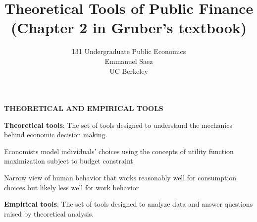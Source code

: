 \documentclass[landscape]{slides}
\author{131 Undergraduate Public Economics \\ Emmanuel Saez \\ UC Berkeley}
\date{}
\title{Theoretical Tools of Public Finance \\ (Chapter 2 in Gruber's textbook)} \onlyslides{1-300}
\begin{document}
\begin{slide}
\maketitle
\end{slide}

%
%
%
%
%

\begin{slide}
\begin{center}
{\bf THEORETICAL AND EMPIRICAL TOOLS}
\end{center}

{\bf Theoretical tools}:
The set of
tools designed to understand
the mechanics behind economic decision making.

Economists model individuals' choices using the concepts of utility function maximization subject
to budget constraint

Narrow view of human behavior that works reasonably well for consumption choices but likely less
well for work behavior

{\bf Empirical tools}:
The set of
tools designed to analyze data
and answer questions raised by theoretical analysis.

\end{slide}


%
%
%
%
\end{document}
